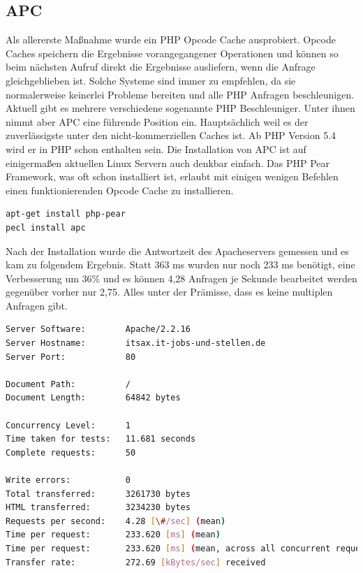 \subsection{APC} Als allererste Maßnahme wurde ein PHP Opcode Cache ausprobiert. Opcode Caches speichern die Ergebnisse vorangegangener Operationen und können so beim nächsten Aufruf direkt die Ergebnisse ausliefern, wenn die Anfrage gleichgeblieben ist. Solche Systeme sind immer zu empfehlen, da sie normalerweise keinerlei Probleme bereiten und alle PHP Anfragen beschleunigen. Aktuell gibt es mehrere verschiedene sogenannte PHP Beschleuniger. Unter ihnen nimmt aber APC eine führende Position ein. Hauptsächlich weil es der zuverlässigste unter den nicht-kommerziellen Caches ist. Ab PHP Version 5.4 wird er in PHP schon enthalten sein. Die Installation von APC ist auf einigermaßen aktuellen Linux Servern auch denkbar einfach. Das PHP Pear Framework, was oft schon installiert ist, erlaubt mit einigen wenigen Befehlen einen funktionierenden Opcode Cache zu installieren. 
\begin{lstlisting}[language=bash,label=Installation von APC,caption=Installation von APC]
apt-get install php-pear
pecl install apc
\end{lstlisting}
Nach der Installation wurde die Antwortzeit des Apacheservers gemessen und es kam zu folgendem Ergebnis. Statt 363 ms wurden nur noch 233 ms benötigt, eine Verbesserung um 36\% und es können 4,28 Anfragen je Sekunde bearbeitet werden gegenüber vorher nur 2,75. Alles unter der Prämisse, dass es keine multiplen Anfragen gibt. 
\begin{lstlisting}[language=bash,label=Ausgabe von ab,caption=Ausgabe von ab]
Server Software:        Apache/2.2.16
Server Hostname:        itsax.it-jobs-und-stellen.de
Server Port:            80

Document Path:          /
Document Length:        64842 bytes

Concurrency Level:      1
Time taken for tests:   11.681 seconds
Complete requests:      50

Write errors:           0
Total transferred:      3261730 bytes
HTML transferred:       3234230 bytes
Requests per second:    4.28 [\#/sec] (mean)
Time per request:       233.620 [ms] (mean)
Time per request:       233.620 [ms] (mean, across all concurrent requests)
Transfer rate:          272.69 [kBytes/sec] received
\end{lstlisting}
